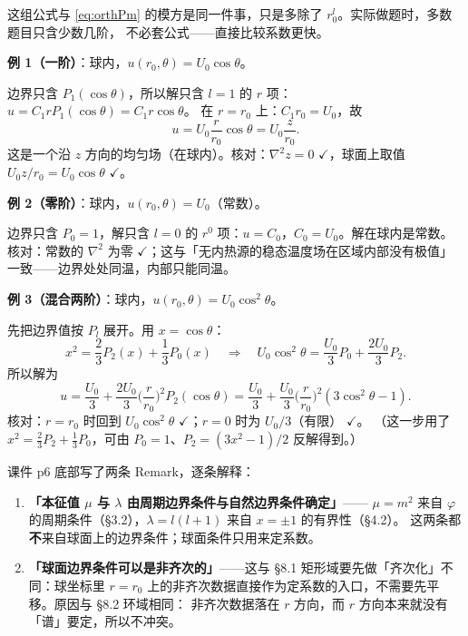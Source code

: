 这组公式与 \eqref{eq:orthPm} 的模方是同一件事，只是多除了 $r_0^l$。实际做题时，多数题目只含少数几阶，
不必套公式——直接比较系数更快。


\textbf{例 1（一阶）}：球内，$u(r_0,\theta)=U_0\cos\theta$。

边界只含 $P_1(\cos\theta)$，所以解只含 $l=1$ 的 $r$ 项：$u=C_1rP_1(\cos\theta)=C_1r\cos\theta$。
在 $r=r_0$ 上：$C_1r_0=U_0$，故
\[
u=U_0\frac{r}{r_0}\cos\theta=U_0\frac{z}{r_0}.
\]
这是一个沿 $z$ 方向的均匀场（在球内）。核对：$\nabla^2z=0$ $\checkmark$，球面上取值 $U_0z/r_0=U_0\cos\theta$ $\checkmark$。

\textbf{例 2（零阶）}：球内，$u(r_0,\theta)=U_0$（常数）。

边界只含 $P_0=1$，解只含 $l=0$ 的 $r^0$ 项：$u=C_0$，$C_0=U_0$。解在球内是常数。
核对：常数的 $\nabla^2$ 为零 $\checkmark$；这与「无内热源的稳态温度场在区域内部没有极值」一致——边界处处同温，内部只能同温。

\textbf{例 3（混合两阶）}：球内，$u(r_0,\theta)=U_0\cos^2\theta$。

先把边界值按 $P_l$ 展开。用 $x=\cos\theta$：
\[
x^2=\frac{2}{3}P_2(x)+\frac{1}{3}P_0(x)
\quad\Longrightarrow\quad
U_0\cos^2\theta=\frac{U_0}{3}P_0+\frac{2U_0}{3}P_2 .
\]
所以解为
\[
u=\frac{U_0}{3}+\frac{2U_0}{3}\Big(\frac{r}{r_0}\Big)^2P_2(\cos\theta)
=\frac{U_0}{3}+\frac{U_0}{3}\Big(\frac{r}{r_0}\Big)^2(3\cos^2\theta-1).
\]
核对：$r=r_0$ 时回到 $U_0\cos^2\theta$ $\checkmark$；$r=0$ 时为 $U_0/3$（有限） $\checkmark$。
（这一步用了 $x^2=\frac{2}{3}P_2+\frac13P_0$，可由 $P_0=1$、$P_2=(3x^2-1)/2$ 反解得到。）


课件 p6 底部写了两条 Remark，逐条解释：

\begin{enumerate}[label=\textbf{(\arabic*)}]
  \item \textbf{「本征值 $\mu$ 与 $\lambda$ 由周期边界条件与自然边界条件确定」}——
        $\mu=m^2$ 来自 $\varphi$ 的周期条件（\S3.2），$\lambda=l(l+1)$ 来自 $x=\pm1$ 的有界性（\S4.2）。
        这两条都\textbf{不}来自球面上的边界条件；球面条件只用来定系数。
  \item \textbf{「球面边界条件可以是非齐次的」}——这与 §8.1 矩形域要先做「齐次化」不同：球坐标里
        $r=r_0$ 上的非齐次数据直接作为定系数的入口，不需要先平移。原因与 §8.2 环域相同：
        非齐次数据落在 $r$ 方向，而 $r$ 方向本来就没有「谱」要定，所以不冲突。
\end{enumerate}

